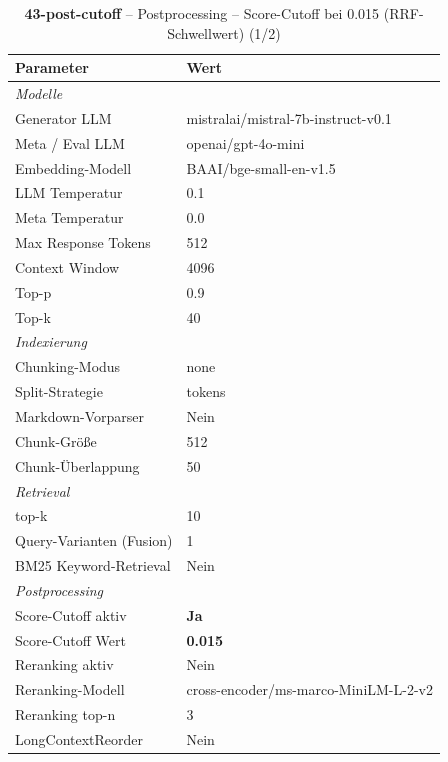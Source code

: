 \begin{table}[H]
\centering
\small
\setlength{\tabcolsep}{4pt}
\begin{tabular}{lp{8cm}}
\toprule
\textbf{Parameter} & \textbf{Wert} \\
\midrule
\multicolumn{2}{l}{\textit{Modelle}} \\
\midrule
\quad Generator LLM & mistralai/mistral-7b-instruct-v0.1 \\
\quad Meta / Eval LLM & openai/gpt-4o-mini \\
\quad Embedding-Modell & BAAI/bge-small-en-v1.5 \\
\quad LLM Temperatur & 0.1 \\
\quad Meta Temperatur & 0.0 \\
\quad Max Response Tokens & 512 \\
\quad Context Window & 4096 \\
\quad Top-p & 0.9 \\
\quad Top-k & 40 \\
\midrule
\multicolumn{2}{l}{\textit{Indexierung}} \\
\midrule
\quad Chunking-Modus & none \\
\quad Split-Strategie & tokens \\
\quad Markdown-Vorparser & Nein \\
\quad Chunk-Größe & 512 \\
\quad Chunk-Überlappung & 50 \\
\midrule
\multicolumn{2}{l}{\textit{Retrieval}} \\
\midrule
\quad top-k & 10 \\
\quad Query-Varianten (Fusion) & 1 \\
\quad BM25 Keyword-Retrieval & Nein \\
\midrule
\multicolumn{2}{l}{\textit{Postprocessing}} \\
\midrule
\quad Score-Cutoff aktiv & \textbf{Ja} \\
\quad Score-Cutoff Wert & \textbf{0.015} \\
\quad Reranking aktiv & Nein \\
\quad Reranking-Modell & cross-encoder/ms-marco-MiniLM-L-2-v2 \\
\quad Reranking top-n & 3 \\
\quad LongContextReorder & Nein \\
\bottomrule
\end{tabular}
\caption{\textbf{43-post-cutoff} -- Postprocessing -- Score-Cutoff bei 0.015 (RRF-Schwellwert) (1/2)}
\label{tab:config_43_post_cutoff_a}
\end{table}

